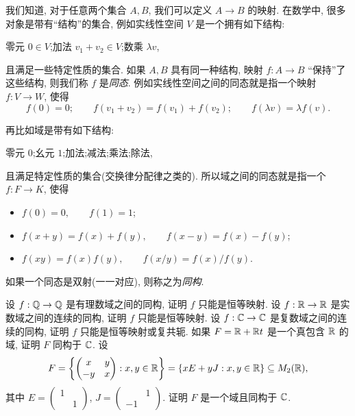 \begin{homework}
    \begin{exlist}
    \item 我们知道, 对于任意两个集合 $A,B$, 我们可以定义 $A\to B$ 的映射.
      在数学中, 很多对象是带有``结构''的集合, 例如实线性空间 $V$ 是一个拥有如下结构:
      \begin{center}
        零元 $0\in V$;\qquad 加法 $v_1+v_2\in V$;\qquad 数乘 $\lambda v$,
      \end{center}
      且满足一些特定性质的集合.
      如果 $A,B$ 具有同一种结构, 映射 $f:A\to B$ ``保持''了这些结构, 则我们称 $f$ 是\emph{同态}.	
      例如实线性空间之间的同态就是指一个映射 $f:V\to W$, 使得
      \[f(0)=0;\qquad f(v_1+v_2)=f(v_1)+f(v_2);\qquad f(\lambda v)=\lambda f(v).\]
    
      再比如域是带有如下结构:
      \begin{center}
        零元 $0$;\qquad 幺元 $1$;\qquad 加法;\qquad 减法;\qquad 乘法;\qquad 除法, 
      \end{center}
      且满足特定性质的集合(交换律分配律之类的). 所以域之间的同态就是指一个 $f:F\to K$, 使得
      \begin{itemize}
        \item $f(0)=0,\qquad f(1)=1$;
        \item $f(x+y)=f(x)+f(y),\qquad f(x-y)=f(x)-f(y)$;
        \item $f(xy)=f(x)f(y),\qquad f(x/y)=f(x)/f(y)$.
      \end{itemize}
      如果一个同态是双射(一一对应), 则称之为\emph{同构}.
      \begin{tasks}
        \task 设 $f:{\mathbb{Q}}\to{\mathbb{Q}}$ 是有理数域之间的同构, 证明 $f$ 只能是恒等映射.
        \task 设 $f:{\mathbb{R}}\to{\mathbb{R}}$ 是实数域之间的连续的同构, 证明 $f$ 只能是恒等映射.
        \task 设 $f:{\mathbb{C}}\to{\mathbb{C}}$ 是复数域之间的连续的同构, 证明 $f$ 只能是恒等映射或复共轭.
        \task 如果 $F={\mathbb{R}}+{\mathbb{R}} t$ 是一个真包含 ${\mathbb{R}}$ 的域, 证明 $F$ 同构于 ${\mathbb{C}}$.
        \task 设
        \[F={\left\{\begin{pmatrix}
        x&y\\-y&x\end{pmatrix}: x,y\in{\mathbb{R}}\right\}}
        ={\left\{xE+yJ: x,y\in{\mathbb{R}}\right\}}\subseteq M_2({\mathbb{R}}),\]
        其中 $E=\begin{pmatrix}1& \\&1\end{pmatrix}$,
        $J=\begin{pmatrix}&1\\-1&\end{pmatrix}$.
        证明 $F$ 是一个域且同构于 ${\mathbb{C}}$.
      \end{tasks}

\end{exlist}
\end{homework}
